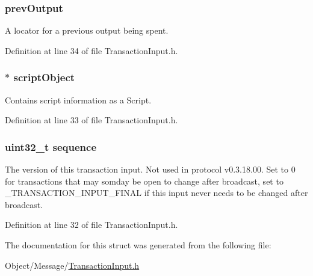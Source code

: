 \hypertarget{struct_m_i_transaction_input_aa2926a5b65b7a9cda9abd6783df43f6f}{
\subsubsection[{prevOutput}]{ {\bf prevOutput}}}
\label{struct_m_i_transaction_input_aa2926a5b65b7a9cda9abd6783df43f6f}
A locator for a previous output being spent. 

Definition at line 34 of file TransactionInput.h.

\hypertarget{struct_m_i_transaction_input_ad2f125749a4bf410b647bc258de817d6}{
\subsubsection[{scriptObject}]{$\ast$ {\bf scriptObject}}}
\label{struct_m_i_transaction_input_ad2f125749a4bf410b647bc258de817d6}
Contains script information as a Script. 

Definition at line 33 of file TransactionInput.h.

\hypertarget{struct_m_i_transaction_input_a0ab03ef2cc38198d3666a992a245fddf}{
\subsubsection[{sequence}]{\setlength{\rightskip}{0pt plus 5cm}uint32\_\-t {\bf sequence}}}
\label{struct_m_i_transaction_input_a0ab03ef2cc38198d3666a992a245fddf}
The version of this transaction input. Not used in protocol v0.3.18.00. Set to 0 for transactions that may somday be open to change after broadcast, set to \_\-TRANSACTION\_\-INPUT\_\-FINAL if this input never needs to be changed after broadcast. 

Definition at line 32 of file TransactionInput.h.



The documentation for this struct was generated from the following file:\begin{DoxyCompactItemize}
\item 
Object/Message/\hyperlink{_m_i_transaction_input_8h}{TransactionInput.h}\end{DoxyCompactItemize}
